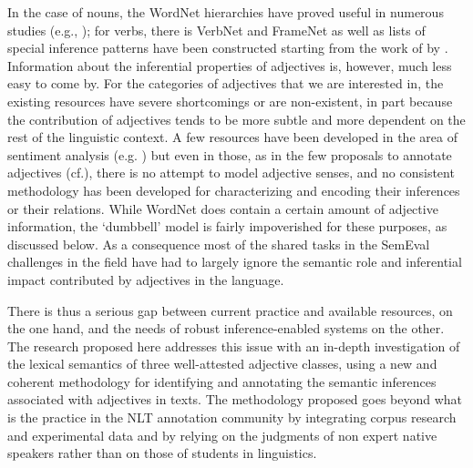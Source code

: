 \documentclass[10pt]{article}
\begin{document}
In the case of nouns, the WordNet hierarchies have proved useful in numerous studies (e.g., \cite{snow04}); for verbs, there is VerbNet and FrameNet as well as lists of special inference patterns have been constructed starting from the work of \cite{kiparsky+kiparsky:1970,karttunen:1971} by \cite{nairn+condoravdi+karttunen:2006,sauri:2008phd,factbank:2009,lotan:2012}. Information about the inferential properties of adjectives is, however, much less easy to come by. For the categories of adjectives that we are interested in, the existing resources have severe shortcomings or are non-existent, in part because the contribution of adjectives tends to be more subtle and more dependent on the rest of the linguistic context. A few resources have been developed in the area of sentiment analysis (e.g. \cite{Hatzivassiloglou97predictingthe}) but even in those, as in the few proposals to annotate adjectives (cf.\cite{Raskin95lexicalsemantics}), there is no attempt to model adjective senses, and no consistent methodology has been developed for characterizing and encoding their inferences or their relations. While WordNet does contain a certain amount of adjective information, the `dumbbell' model is fairly impoverished for these purposes, as discussed below. As a consequence most of the shared tasks in the SemEval challenges in the field have had to largely ignore the semantic role and inferential impact contributed by adjectives in the language.

There is thus a serious gap between current practice and available resources, on the one hand, and the needs of robust inference-enabled systems on the other. The research proposed here addresses this issue with an in-depth investigation of the lexical semantics of three well-attested adjective classes, using a new and coherent methodology for identifying and annotating the semantic inferences associated with adjectives in texts. The methodology proposed goes beyond what is the practice in the NLT annotation community by integrating corpus research and experimental data and by relying on the judgments of non expert native speakers rather than on those of students in linguistics.
\end{document}
